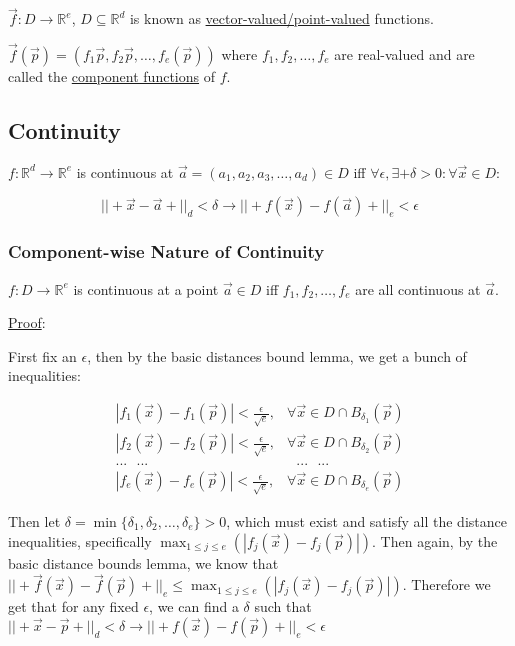 \documentclass[11 pt, twoside]{article}
\begin{document}
$\vec{f}: D \to \mathbb{R}^e$, $D \subseteq \mathbb{R}^d$ is known as
\underline{vector-valued/point-valued} functions.

$\vec{f}(\vec{p}) = (f_1{\vec{p}}, f_2{\vec{p}}, \dots, f_e(\vec{p}))$ where
$f_1, f_2, \dots, f_e$ are real-valued and are called the \underline{component
functions} of $f$.

\subsection{Continuity}
$f: \mathbb{R}^d \to \mathbb{R}^e$ is continuous at $\vec{a} = (a_1, a_2,
a_3, \dots, a_d) \in D$ iff $\forall \epsilon, \exists+\delta > 0 : \forall \vec{x} \in D$:

$$||+\vec{x} - \vec{a}+||_d < \delta \to ||+f(\vec{x}) - f(\vec{a})+||_e <
\epsilon$$

\subsubsection{Component-wise Nature of Continuity}
$f: D \to \mathbb{R}^e$ is continuous at a point $\vec{a} \in D$ iff $f_1,
f_2, \dots, f_e$ are all continuous at $\vec{a}$.

\underline{Proof}:

First fix an $\epsilon$, then by the basic distances bound lemma, we get a
bunch of inequalities:

\begin{align*}
    |f_1(\vec{x}) - f_1(\vec{p})| < \frac{\epsilon}{\sqrt{e}}, &\forall \vec{x} \in D \cap B_{\delta_1}(\vec{p})\\
    |f_2(\vec{x}) - f_2(\vec{p})| < \frac{\epsilon}{\sqrt{e}}, &\forall \vec{x} \in D \cap B_{\delta_2}(\vec{p})\\
    ... \text{ } ... \text{ } & \text{ } ... \text{ }...\\
    |f_e(\vec{x}) - f_e(\vec{p})| < \frac{\epsilon}{\sqrt{e}}, &\forall
    \vec{x} \in D \cap B_{\delta_e}(\vec{p})
\end{align*}

Then let $\delta = \min\{\delta_1, \delta_2, \dots, \delta_e\} > 0$, which must
exist and satisfy all the distance inequalities, specifically $\max_{1 \leq j
\leq e}(|f_j(\vec{x}) - f_j(\vec{p})|)$. Then again, by the basic distance
bounds lemma, we know that $||+\vec{f}(\vec{x}) - \vec{f}(\vec{p})+||_e \leq \max_{1 \leq j
\leq e}(|f_j(\vec{x}) - f_j(\vec{p})|)$. Therefore we get that for any fixed
$\epsilon$, we can find a $\delta$ such that $||+\vec{x} - \vec{p}+||_d <
\delta \to ||+f(\vec{x}) - f(\vec{p})+||_e < \epsilon$
\end{document}
